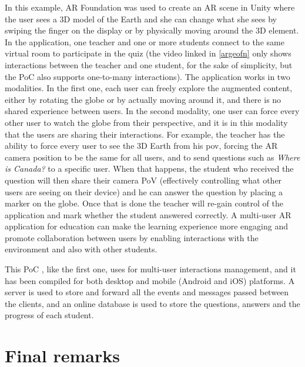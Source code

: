 In this example, AR Foundation was used to create an AR scene in Unity where the user sees a 3D model of the Earth and she can change what she sees by swiping the finger on the display or by physically moving around the 3D element. In the application, one teacher and one or more students connect to the same virtual room to participate in the quiz (the video linked in \cref{argeofn} only shows interactions between the teacher and one student, for the sake of simplicity, but the PoC also supports one-to-many interactions). The application works in two modalities. In the first one, each user can freely explore the augmented content, either by rotating the globe or by actually moving around it, and there is no shared experience between users. In the second modality, one user can force every other user to watch the globe from their perspective, and it is in this modality that the users are sharing their interactions. For example, the teacher has the ability to force every user to see the 3D Earth from his \gls{pov}, forcing the AR camera position to be the same for all users, and to send questions such as \textit{Where is Canada?} to a specific user. When that happens, the student who received the question will then share their camera PoV (effectively controlling what other users are seeing on their device) and he can answer the question by placing a marker on the globe. Once that is done the teacher will re-gain control of the application and mark whether the student answered correctly. A multi-user AR application for education can make the learning experience more engaging and promote collaboration between users by enabling interactions with the environment and also with other students.

This PoC , like the first one, uses \ork{} for multi-user interactions management, and it has been compiled for both desktop and mobile (Android and iOS) platforms. A server is used to store and forward all the events and messages passed between the clients, and an online database is used to store the questions, answers and the progress of each student.



\section{Final remarks}\label{arch:conclusions}

